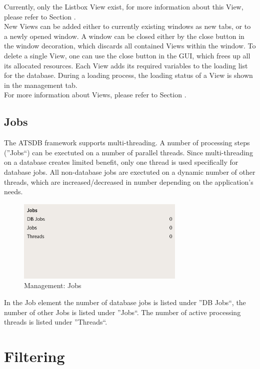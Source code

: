 \documentclass[10pt,letterpaper,extrafontsizes]{memoir}
\begin{document}
Currently, only the Listbox View exist, for more information about this View, please refer to Section .\\

New Views can be added either to currently existing windows as new tabs, or to a newly opened window. A window can be closed either by the close button in the window decoration, which discards all contained Views within the window.  To delete a single View, one can use the close button in the GUI, which frees up all its allocated resources. Each View adds its required variables to the loading list for the database.  During a loading process, the loading status  of a View is shown in the management tab.\\

For more information about Views, please refer to Section .

\subsection{Jobs}

The ATSDB framework supports multi-threading. A number of processing steps (''Jobs``) can be exectuted on a number of parallel threads. Since multi-threading on a database creates limited benefit, only one thread is used specifically for database jobs. All non-database jobs are exectuted on a dynamic number of other threads, which are increased/decreased in number depending on the application's needs. 

\begin{figure}[H]
  \center
    \includegraphics[width=8cm]{../screenshots/management_jobs.png}
  \caption{Management: Jobs}
  \label{fig:management_jobs}
\end{figure}

In the Job element the number of database jobs is listed under ''DB Jobs``, the number of other Jobs is listed under ''Jobs``. The number of active processing threads is listed under ''Threads``.

\section{Filtering}
\label{sec:filtering}
\end{document}

